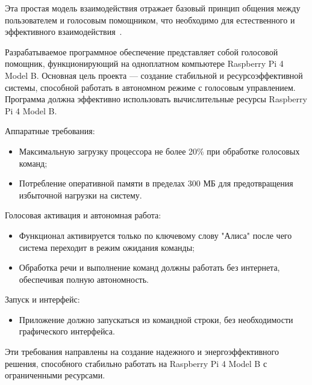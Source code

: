  Эта простая модель взаимодействия отражает базовый принцип общения между пользователем и голосовым помощником, что необходимо для естественного и эффективного взаимодействия~\cite{name22}.
 
Разрабатываемое программное обеспечение представляет собой голосовой помощник, функционирующий на одноплатном компьютере Raspberry Pi 4 Model B.
Основная цель проекта — создание стабильной и ресурсоэффективной системы, способной работать в автономном режиме с голосовым управлением.
Программа должна эффективно использовать вычислительные ресурсы Raspberry Pi 4 Model B.

Аппаратные требования:
\begin{itemize}
	\item Максимальную загрузку процессора не более 20\% при обработке голосовых команд;
	\item Потребление оперативной памяти в пределах 300 МБ для предотвращения избыточной нагрузки на систему.
\end{itemize}

Голосовая активация и автономная работа:
\begin{itemize}
	\item Функционал активируется только по ключевому слову "Алиса" после чего система переходит в режим ожидания команды;
	\item Обработка речи и выполнение команд должны работать без интернета, обеспечивая полную автономность.
\end{itemize}

Запуск и интерфейс:
\begin{itemize}
	\item Приложение должно запускаться из командной строки, без необходимости графического интерфейса.
\end{itemize}

Эти требования направлены на создание надежного и энергоэффективного решения, способного стабильно работать на Raspberry Pi 4 Model B с ограниченными ресурсами.
\newpage
